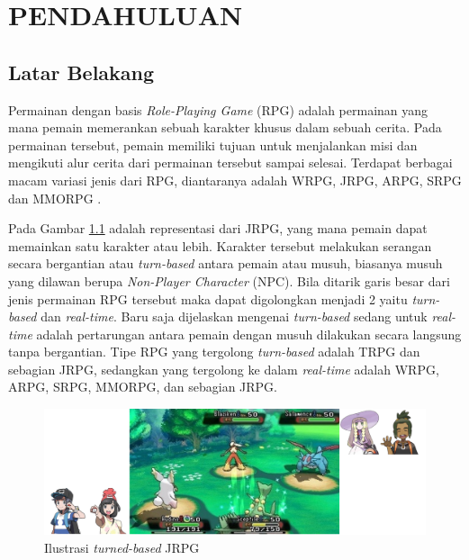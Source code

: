 \chapter{PENDAHULUAN}
\vspace{4ex}
\label{chap:chap1_introduction}

\section{Latar Belakang}
\vspace{1ex}

Permainan dengan basis \textit{Role-Playing Game} (RPG) adalah permainan yang mana pemain memerankan sebuah karakter khusus dalam sebuah cerita. Pada permainan tersebut, pemain memiliki tujuan untuk menjalankan misi dan mengikuti alur cerita dari permainan tersebut sampai selesai. Terdapat berbagai macam variasi jenis dari RPG, diantaranya adalah WRPG, JRPG, ARPG, SRPG dan MMORPG \citep{stenstrom2012}. 
\vspace{1ex}

Pada Gambar \ref{fig:rpg_turn_based} adalah representasi dari JRPG, yang mana pemain dapat memainkan satu karakter atau lebih. Karakter tersebut melakukan serangan secara bergantian atau \textit{turn-based} antara pemain atau musuh, biasanya musuh yang dilawan berupa \textit{Non-Player Character} (NPC). Bila ditarik garis besar dari jenis permainan RPG tersebut maka dapat digolongkan menjadi 2 yaitu \textit{turn-based} dan \textit{real-time}. Baru saja dijelaskan mengenai \textit{turn-based} sedang untuk \textit{real-time} adalah pertarungan antara pemain dengan musuh dilakukan secara langsung tanpa bergantian. Tipe RPG yang tergolong \textit{turn-based} adalah TRPG dan sebagian JRPG, sedangkan yang tergolong ke dalam \textit{real-time} adalah WRPG, ARPG, SRPG, MMORPG, dan sebagian JRPG.
\vspace{1ex}

\begin{figure} [!h] \centering
	\includegraphics[scale=0.45]{img/turn_based.png}
	\caption{Ilustrasi \textit{turned-based} JRPG}
	\label{fig:rpg_turn_based}
\end{figure}

